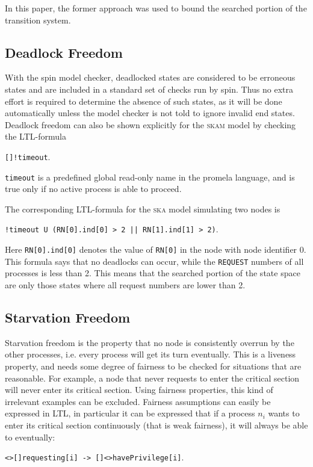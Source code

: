 \documentclass[a4paper,10pt]{llncs}
\begin{document}
In this paper, the former approach was used to bound the searched portion of the transition system.

\subsection{Deadlock Freedom}
With the spin model checker, deadlocked states are considered to be erroneous states and are included in a standard set of checks run by spin. Thus no extra effort is required to determine the absence of such states, as it will be done automatically unless the model checker is not told to ignore invalid end states. Deadlock freedom can also be shown explicitly for the \textsc{skam} model by checking the LTL-formula

\texttt{[]!timeout}.

\texttt{timeout} is a predefined global read-only name in the promela language, and is true only if no active process is able to proceed.

The corresponding LTL-formula for the \textsc{ska} model simulating two nodes is

\texttt{!timeout U (RN[0].ind[0] > 2 || RN[1].ind[1] > 2)}.

Here \texttt{RN[0].ind[0]} denotes the value of \texttt{RN[0]} in the node with node identifier 0. This formula says that no deadlocks can occur, while the \texttt{REQUEST} numbers of all processes is less than 2. This means that the searched portion of the state space are only those states where all request numbers are lower than 2.

\subsection{Starvation Freedom}
Starvation freedom is the property that no node is consistently overrun by the other processes, i.e. every process will get its turn eventually. This is a liveness property, and needs some degree of fairness to be checked for situations that are reasonable. For example, a node that never requests to enter the critical section will never enter its critical section. Using fairness properties, this kind of irrelevant examples can be excluded. Fairness assumptions can easily be expressed in LTL, in particular it can be expressed that if a process $n_i$ wants to enter its critical section continuously (that is weak fairness), it will always be able to eventually:

 \texttt{<>[]requesting[i] -> []<>havePrivilege[i]}.
\end{document}
